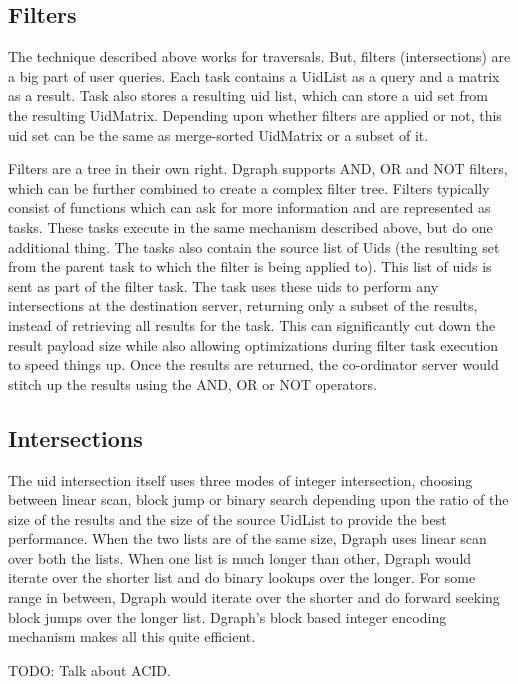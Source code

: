 \documentclass[letterpaper,twocolumn,10pt]{article}
\begin{document}
\subsection{Filters}

The technique described above works for traversals. But, filters (intersections)
are a big part of user queries. Each task contains a UidList as a query and a
matrix as a result. Task also stores a resulting uid list, which can store a
uid set from the resulting UidMatrix. Depending upon whether filters are applied
or not, this uid set can be the same as merge-sorted UidMatrix or a subset of
it.

Filters are a tree in their own right. Dgraph supports AND, OR and NOT filters,
which can be further combined to create a complex filter tree. Filters typically
consist of functions which can ask for more information and are represented as
tasks.  These tasks execute in the same mechanism described above, but do one
additional thing. The tasks also contain the source list of Uids (the resulting
set from the parent task to which the filter is being applied to). This list of
uids is sent as part of the filter task. The task uses these uids to perform any
intersections at the destination server, returning only a subset of the results,
instead of retrieving all results for the task. This can significantly cut down
the result payload size while also allowing optimizations during filter task
execution to speed things up. Once the results are returned, the co-ordinator
server would stitch up the results using the AND, OR or NOT operators.

\subsection{Intersections}

The uid intersection itself uses three modes of integer intersection, choosing
between linear scan, block jump or binary search depending upon the ratio of the
size of the results and the size of the source UidList to provide the best
performance. When the two lists are of the same size, Dgraph
uses linear scan over both the lists. When one list is much
longer than other, Dgraph would iterate over the shorter list and do
binary lookups over the longer. For some range in between, Dgraph would iterate
over the shorter and do forward seeking block jumps over the longer list.
Dgraph's block based integer encoding mechanism makes all this quite efficient.

TODO: Talk about ACID.
\end{document}
